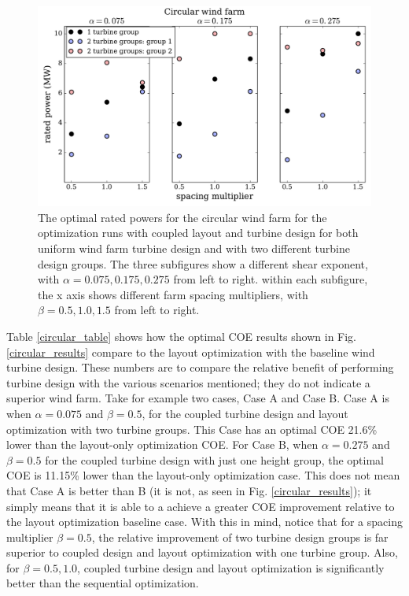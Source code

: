 \begin{figure}[htbp]
  \centering
  \includegraphics[width=\textwidth]{Figures/circlePowers.pdf}
  \caption{\label{circular_power} The optimal rated powers for the circular wind farm for the optimization runs with coupled layout and turbine design for both uniform wind farm turbine design and with two different turbine design groups. The three subfigures show a different shear exponent, with $\alpha=0.075,0.175,0.275$ from left to right. within each subfigure, the x axis shows different farm spacing multipliers, with $\beta=0.5,1.0,1.5$ from left to right.}
\end{figure}

Table \ref{circular_table} shows how the optimal COE results shown in Fig. \ref{circular_results} compare to the layout optimization with the baseline wind turbine design. These numbers are to compare the relative benefit of performing turbine design with the various scenarios mentioned; they do not indicate a superior wind farm. Take for example two cases, Case A and Case B. Case A is when $\alpha=0.075$ and $\beta=0.5$, for the coupled turbine design and layout optimization with two turbine groups. This Case has an optimal COE 21.6\% lower than the layout-only optimization COE. For Case B, when $\alpha=0.275$ and $\beta=0.5$ for the coupled turbine design with just one height group, the optimal COE is 11.15\% lower than the layout-only optimization case. This does not mean that Case A is better than B (it is not, as seen in Fig. \ref{circular_results}); it simply means that it is able to a achieve a greater COE improvement relative to the layout optimization baseline case. With this in mind, notice that for a spacing multiplier $\beta=0.5$, the relative improvement of two turbine design groups is far superior to coupled design and layout optimization with one turbine group. Also, for $\beta=0.5,1.0$, coupled turbine design and layout optimization is significantly better than the sequential optimization.

